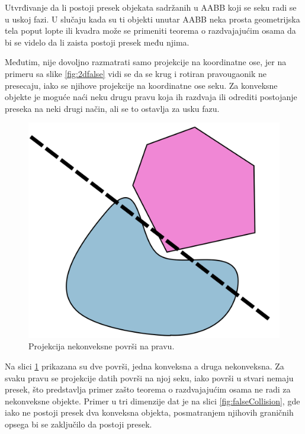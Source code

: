 \documentclass[12pt,oneside]{memoir}
\begin{document}
Utvrđivanje da li postoji presek objekata sadržanih u AABB koji se seku radi se u uskoj fazi.
U slučaju kada su ti objekti unutar AABB neka prosta geometrijska tela poput
lopte ili kvadra može se primeniti teorema o razdvajajućim osama da bi se videlo da li zaista postoji presek među njima. 


Međutim, nije dovoljno razmatrati samo projekcije na koordinatne ose, 
jer na primeru sa slike \ref{fig:2dfalse} vidi se da se krug i rotiran pravougaonik ne presecaju, iako se njihove projekcije 
na koordinatne ose seku. Za konveksne objekte je moguće naći neku drugu pravu koja ih razdvaja ili odrediti postojanje preseka 
na neki drugi način, ali se to ostavlja za usku fazu.

\begin{figure}[h!]
	\begin{center}
	\includegraphics[scale=0.17]{theorem_counterexample.png}
	\end{center}
	\caption{Projekcija nekonveksne površi na pravu.}
	\label{fig:counter}
\end{figure}

Na slici \ref{fig:counter} prikazana su dve površi, jedna konveksna a druga nekonveksna. 
Za svaku pravu se projekcije datih površi na njoj seku, iako površi u stvari nemaju presek, što predstavlja
primer zašto teorema o razdvajajućim osama ne radi za nekonveksne objekte. 
Primer u tri dimenzije dat je na slici \ref{fig:falseCollision}, gde iako ne postoji presek dva konveksna objekta, 
posmatranjem njihovih graničnih opsega bi se zaključilo da postoji presek.
\end{document}
